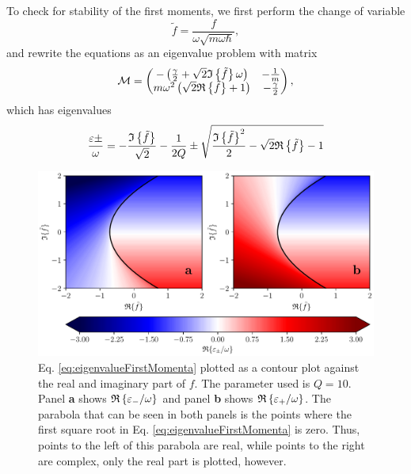 To check for stability of the first moments, we first perform the change of variable
\begin{equation}
    \tilde{f} = \frac{f}{\omega \sqrt{m \omega \hbar}},
\end{equation}
and rewrite the equations as an eigenvalue problem with matrix
\begin{equation}
    \mathcal{M} = 
    \begin{pmatrix}
        - \left(\frac{\gamma}{2} + \sqrt{2} \mathfrak{I}\left\{\tilde{f}\right\} \omega \right) & - \frac{1}{m} \\
        m \omega^2\left(\sqrt{2}\mathfrak{R}\left\{\tilde{f}\right\} + 1\right) & -\frac{\gamma}{2}
    \end{pmatrix}, \label{eq:matrixM}
\end{equation}
which has eigenvalues
\begin{equation}
    \frac{\varepsilon\pm}{\omega} =- \frac{\mathfrak{I}\left\{\tilde{f}\right\}}{ \sqrt{2}} - \frac{1}{2Q} \pm\sqrt{\frac{\mathfrak{I}\left\{\tilde{f}\right\}^2}{2} - \sqrt{2} \mathfrak{R}\left\{\tilde{f}\right\} - 1 }  \label{eq:eigenvalueFirstMomenta}
\end{equation}


\begin{figure}
    \centering
    \includegraphics[width=\textwidth]{figures/eigenvalueFirstMomenta.pdf}
    \caption{\small Eq. \eqref{eq:eigenvalueFirstMomenta} plotted as a contour plot against the real and imaginary part of $f$. The parameter used is $Q = 10$. Panel \textbf{a} shows $\mathfrak{R}\left\{\varepsilon_-/\omega\right\}$ and panel \textbf{b} shows $\mathfrak{R}\left\{\varepsilon_+/\omega\right\}$. The parabola that can be seen in both panels is the points where the first square root in Eq. \eqref{eq:eigenvalueFirstMomenta} is zero. Thus, points to the left of this parabola are real, while points to the right are complex, only the real part is plotted, however.}
    \label{fig:eigenvalueFirstMomenta}
\end{figure}


